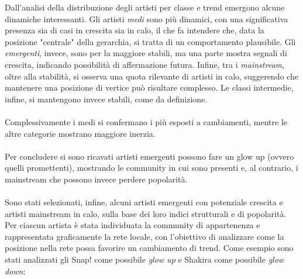 \documentclass[sigchi]{acmart}
\begin{document}
\noindent Dall'analisi della distribuzione degli artisti per classe e trend emergono alcune dinamiche interessanti. Gli artisti \textit{medi} sono più dinamici, con una significativa presenza sia di casi in crescita sia in calo, il che fa intendere che, data la posizione "centrale" della gerarchia, si tratta di un comportamento plausibile. Gli \textit{emergenti}, invece, sono per la maggiore stabili, ma una parte mostra segnali di crescita, indicando possibilità di affermazione futura. Infine, tra i \textit{mainstream}, oltre alla stabilità, si osserva una quota rilevante di artisti in calo, suggerendo che mantenere una posizione di vertice può risultare complesso. Le classi intermedie, infine, si mantengono invece stabili, come da definizione. \\ \\ Complessivamente i medi si confermano i più esposti a cambiamenti, mentre le altre categorie mostrano maggiore inerzia. \\ \\ Per concludere si sono ricavati artisti emergenti possono fare un glow up (ovvero quelli promettenti), mostrando le community in cui sono presenti e, al contrario, i mainstream che possono invece perdere popolarità. \\ \\ Sono stati selezionati, infine, alcuni artisti emergenti con potenziale crescita e artisti mainstream in calo, sulla base dei loro indici strutturali e di popolarità. Per ciascun artista è stata individuata la community di appartenenza e rappresentata graficamente la rete locale, con l'obiettivo di analizzare come la posizione nella rete possa favorire un cambiamento di trend. Come esempio sono stati analizzati gli Snap! come possibile {\itshape glow up} e Shakira come possibile {\itshape glow down}:
\end{document}
